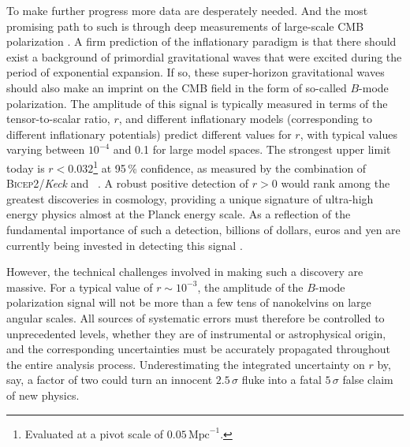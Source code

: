 \documentclass[twocolumn]{aa}
\begin{document}
To make further progress more data are desperately needed. And the
most promising path to such is through deep measurements of
large-scale CMB polarization \citep[e.g.,][]{kamionkowski:2016}. A
firm prediction of the inflationary paradigm is that there should
exist a background of primordial gravitational waves that were excited
during the period of exponential expansion. If so, these super-horizon
gravitational waves should also make an imprint on the CMB field in
the form of so-called $B$-mode polarization. The amplitude of this
signal is typically measured in terms of the tensor-to-scalar ratio,
$r$, and different inflationary models (corresponding to different
inflationary potentials) predict different values for $r$, with
typical values varying between $10^{-4}$ and 0.1 for large model
spaces. The strongest upper limit today is $r<0.032$\footnote{Evaluated at a pivot scale of $0.05 \, \mathrm{Mpc}^{-1}$.} at 95\,\%
confidence, as measured by the combination of \textsc{Bicep2}/\textit{Keck} and
\Planck\ \citep{tristram:2021}. A robust positive detection of $r>0$
would rank among the greatest discoveries in cosmology, providing a
unique signature of ultra-high energy physics almost at the Planck
energy scale. As a reflection of the fundamental importance of such a detection, billions of dollars, euros and yen are currently
being invested in detecting this signal \citep{bp05}.

However, the technical challenges involved in making such a discovery
are massive. For a typical value of $r\sim10^{-3}$, the amplitude of
the $B$-mode polarization signal will not be more than a few tens of
nanokelvins on large angular scales. All sources of systematic errors
must therefore be controlled to unprecedented levels, whether they are
of instrumental or astrophysical origin, and the corresponding
uncertainties must be accurately propagated throughout the entire
analysis process. Underestimating the integrated uncertainty on $r$
by, say, a factor of two could turn an innocent $2.5\,\sigma$ fluke into
a fatal $5\,\sigma$ false claim of new physics.
\end{document}
